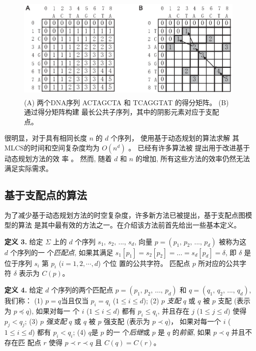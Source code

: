 \begin{figure}[!h]
  \centering
  \includegraphics[height=2in, width=4.5in]{figures/4_MLCS/DM}
  \vspace{1em}
  \caption{(A) 两个DNA序列 ACTAGCTA 和 TCAGGTAT 的得分矩阵。 (B) 通过得分矩阵构建
    最长公共子序列，其中的阴影元素对应于支配点。}
\label{fig:DM}
\end{figure}

很明显，对于具有相同长度 $n$ 的 $d$ 个序列， 使用基于动态规划的算法求解
其MLCS的时间和空间复杂度均为 $O(n^d)$ \cite{Hsu1984}。 已经有许多算法被
提出用于改进基于动态规划方法的效
率 \cite{Hirschberg1977,Apostolico1992,Masek1980,Rick1994}。 然而, 随着
$d$ 和 $n$ 的增加, 所有这些方法的效率仍然无法满足实际需求。

\subsection{基于支配点的算法}
\label{sec:Dominant Point}

为了减少基于动态规划方法的时空复杂度，许多新方法已被提出，基于支配点图模型的算法
是其中最有效的方法之一。在介绍该方法前首先给出一些基本定义。

\textbf{定义 3.} 给定 $\Sigma$ 上的 $d$ 个序列 $s_1,\, s_2,\, ...,\,
s_d$, 向量 $p = (p_1,\, p_2,\, ...,\, p_d)$ 被称为这 $d$ 个序列的一
个\emph{匹配点}, 如果其满足 $s_1[p_1] = s_2[p_2] = ... = s_d[p_d] =
\delta$, 即 $\delta$ 是位于序列 $s_i$ 第 $p_i$ ($i=1,2,\cdots,d$) 个位
置的公共字符。 匹配点 $p$ 所对应的公共字符 $\delta$ 表示为 $C(p)$。

\textbf{定义 4.} 给定 $d$ 个序列的两个匹配点 $p = (p_1,\, p_2,\,
...,\, p_d)$ 和 $q = (q_1,\, q_2,\, ...,\, q_d)$, 我们称： (1) $p =
q$当且仅当 $p_i = q_i$ ($1 \leq i \leq d$); (2) $p$
\emph{支配 }$q$ 或 $q$ 被 $p$ 支配 (表示为 $p \preceq q$), 如果对每一
个 $i$ ($1 \leq i \leq d$) 都有 $p_i \leq q_i$, 并且存在 $j$
($1 \leq j \leq d$) 使得 $p_j<q_j$; (3) $p$ \emph{强支配}
$q$ 或 $q$ 被 $p$ 强支配 (表示为 $p \prec q$)， 如果对每一个 $i$ ($1
\leq i \leq d$) 都有 $p_i < q_i$; (4) $q$是 $p$ 的一
个\emph{后继}或 $p$ 是 $q$ 的\emph{前驱}, 如果 $p \prec q$ 并且不存在匹
配点 $r$ 使得 $p \prec r \prec q$ 且 $C(q) = C(r)$。

